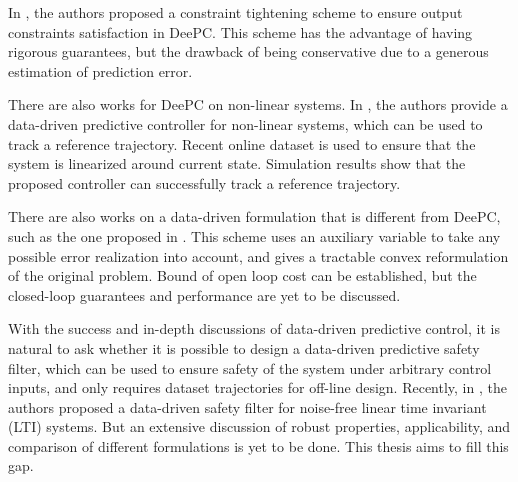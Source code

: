 In \cite{berberichRobustConstraintSatisfaction2020}, the authors proposed a constraint tightening scheme to ensure output constraints satisfaction in DeePC.
This scheme has the advantage of having rigorous guarantees, but the drawback of being conservative due to a generous estimation of prediction error.

There are also works for DeePC on non-linear systems.
In \cite{berberichLinearTrackingMPCData2022}, the authors provide a data-driven predictive controller for non-linear systems, which can be used to track a reference trajectory.
Recent online dataset is used to ensure that the system is linearized around current state.
Simulation results show that the proposed controller can successfully track a reference trajectory.

There are also works on a data-driven formulation that is different from DeePC, such as the one proposed in \cite{huangRobustDataEnabledPredictive2023}.
This scheme uses an auxiliary variable to take any possible error realization into account, and gives a tractable convex reformulation of the original problem.
Bound of open loop cost can be established, but the closed-loop guarantees and performance are yet to be discussed.

With the success and in-depth discussions of data-driven predictive control, it is natural to ask whether it is possible to design a data-driven predictive safety filter, which can be used to ensure safety of the system under arbitrary control inputs, and only requires dataset trajectories for off-line design.
Recently, in \cite{bajelaniDataDrivenSafetyFilter2023}, the authors proposed a data-driven safety filter for noise-free linear time invariant (LTI) systems.
But an extensive discussion of robust properties, applicability, and comparison of different formulations is yet to be done.
This thesis aims to fill this gap.

